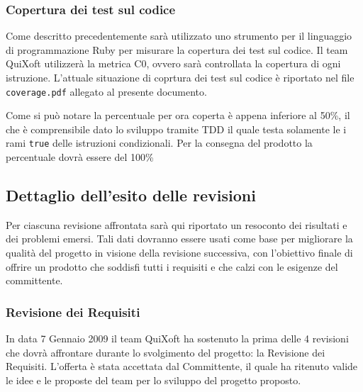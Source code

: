 \documentclass[11pt,a4paper]{article}
\begin{document}
\subsubsection{Copertura dei test sul codice}
Come descritto precedentemente sarà utilizzato uno strumento per il linguaggio di programmazione Ruby per misurare la copertura dei test sul codice. Il team QuiXoft utilizzerà la metrica C0, ovvero sarà controllata la copertura di ogni istruzione. L'attuale situazione di coprtura dei test sul codice è riportato nel file \verb|coverage.pdf| allegato al presente documento.

Come si può notare la percentuale per ora coperta è appena inferiore al 50\%, il che è comprensibile dato lo sviluppo tramite TDD il quale testa solamente le i rami \verb|true| delle istruzioni condizionali. Per la consegna del prodotto la percentuale dovrà essere del 100\%
\subsection{Dettaglio dell'esito delle revisioni}
Per ciascuna revisione affrontata sarà qui riportato un resoconto dei risultati e dei problemi emersi. Tali dati dovranno essere usati come base per migliorare la qualità del progetto in visione della revisione successiva, con l'obiettivo finale di offrire un prodotto che soddisfi tutti i requisiti e che calzi con le esigenze del committente.
\subsubsection{Revisione dei Requisiti}
In data 7 Gennaio 2009 il team QuiXoft ha sostenuto la prima delle 4 revisioni che dovrà affrontare durante lo svolgimento del progetto: la Revisione dei Requisiti.
L'offerta è stata accettata dal Committente, il quale ha ritenuto valide le idee e le proposte del team per lo sviluppo del progetto proposto.
\end{document}
